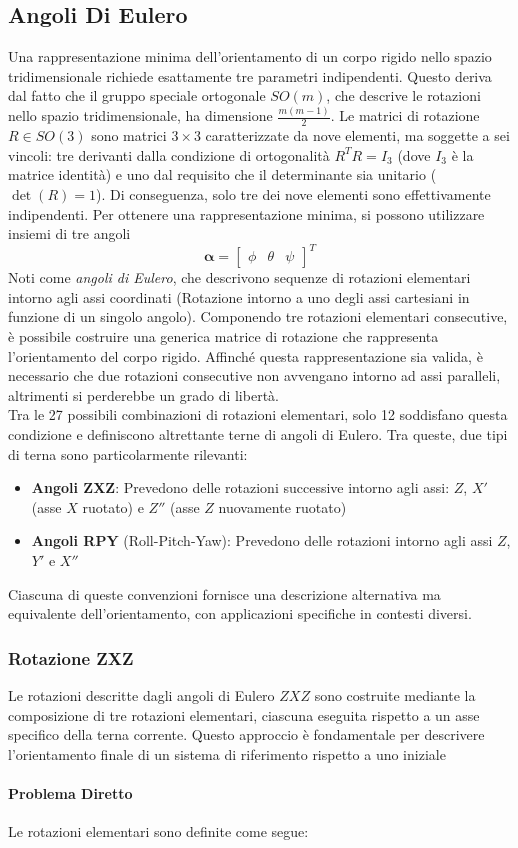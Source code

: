 \documentclass[11pt, a4paper]{report}
\begin{document}
\subsection{Angoli Di Eulero}
Una rappresentazione minima dell'orientamento di un corpo rigido nello spazio tridimensionale richiede esattamente tre parametri indipendenti. Questo deriva dal fatto che il gruppo speciale ortogonale $ SO(m) $, che descrive le rotazioni nello spazio tridimensionale, ha dimensione $\frac{m(m-1)}{2}$. Le matrici di rotazione $ R \in SO(3) $ sono matrici $ 3 \times 3 $ caratterizzate da nove elementi, ma soggette a sei vincoli: tre derivanti dalla condizione di ortogonalità $ R^T R = I_3 $ (dove $ I_3 $ è la matrice identità) e uno dal requisito che il determinante sia unitario ($ \det(R) = 1 $). Di conseguenza, solo tre dei nove elementi sono effettivamente indipendenti. Per ottenere una rappresentazione minima, si possono utilizzare insiemi di tre angoli
\[
    \boldsymbol{\alpha} =
    \begin{bmatrix}
        \phi & \theta & \psi
    \end{bmatrix}^{T}
\]
Noti come \textit{angoli di Eulero}, che descrivono sequenze di rotazioni elementari intorno agli assi coordinati (Rotazione intorno a uno degli assi cartesiani in funzione di un singolo angolo). Componendo tre rotazioni elementari consecutive, è possibile costruire una generica matrice di rotazione che rappresenta l'orientamento del corpo rigido. Affinché questa rappresentazione sia valida, è necessario che due rotazioni consecutive non avvengano intorno ad assi paralleli, altrimenti si perderebbe un grado di libertà.\\
Tra le 27 possibili combinazioni di rotazioni elementari, solo 12 soddisfano questa condizione e definiscono altrettante terne di angoli di Eulero. Tra queste, due tipi di terna sono particolarmente rilevanti:
\begin{itemize}
    \item \textbf{Angoli ZXZ}: Prevedono delle rotazioni successive intorno agli assi: $ Z $, $ X' $ (asse $ X $ ruotato) e $ Z'' $ (asse $ Z $ nuovamente ruotato)
    \item \textbf{Angoli RPY} (Roll-Pitch-Yaw): Prevedono delle rotazioni intorno agli assi $ Z $, $ Y' $ e $ X'' $
\end{itemize}
Ciascuna di queste convenzioni fornisce una descrizione alternativa ma equivalente dell'orientamento, con applicazioni specifiche in contesti diversi.

\subsubsection{Rotazione ZXZ}
Le rotazioni descritte dagli angoli di Eulero $ ZXZ $ sono costruite mediante la composizione di tre rotazioni elementari, ciascuna eseguita rispetto a un asse specifico della terna corrente. Questo approccio è fondamentale per descrivere l'orientamento finale di un sistema di riferimento rispetto a uno iniziale \paragraph{Problema Diretto} Le rotazioni elementari sono definite come segue:
\end{document}
